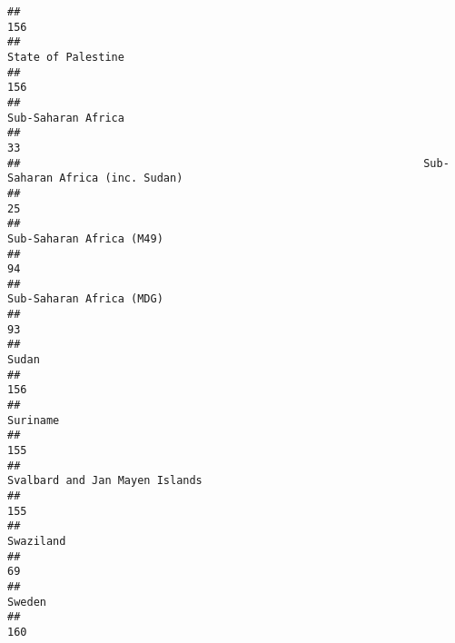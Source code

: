 \documentclass[]{article}
\begin{document}
\begin{verbatim}
##                                                                                          156 
##                                                                           State of Palestine 
##                                                                                          156 
##                                                                           Sub-Saharan Africa 
##                                                                                           33 
##                                                              Sub-Saharan Africa (inc. Sudan) 
##                                                                                           25 
##                                                                     Sub-Saharan Africa (M49) 
##                                                                                           94 
##                                                                     Sub-Saharan Africa (MDG) 
##                                                                                           93 
##                                                                                        Sudan 
##                                                                                          156 
##                                                                                     Suriname 
##                                                                                          155 
##                                                               Svalbard and Jan Mayen Islands 
##                                                                                          155 
##                                                                                    Swaziland 
##                                                                                           69 
##                                                                                       Sweden 
##                                                                                          160 
##                                                                                  Switzerland 
##                                                                                          160 
##                                                                         Syrian Arab Republic 
##                                                                                          160 
##                                                                                   Tajikistan 
##                                                                                          160 

\end{verbatim}
\end{document}
